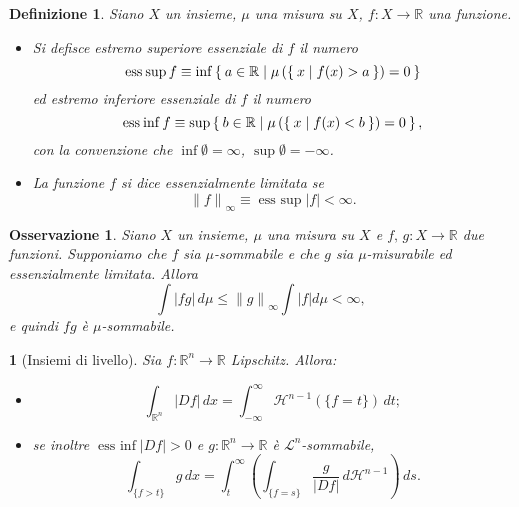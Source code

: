 \documentclass[a4paper,10pt,openright,oneside]{book}
\theoremstyle{theoremstyle}
\theoremstyle{theoremstylewoheader}
\newtheorem{teorema2}[teorema]{}
\theoremstyle{theoremstyle}
\newtheorem{definizione}[teorema]{Definizione}
\newtheorem{osservazione}[teorema]{Osservazione}
\theoremstyle{proofsecstyle}
\theoremstyle{nonumberplain}
\newcommand{\RR}{\ensuremath{\mathbb{R}}}
\newcommand{\Leb}{\ensuremath{\mathcal{L}}}
\newcommand{\Haus}{\ensuremath{\mathcal{H}}}
\newcommand{\abs}[1]{\ensuremath{\lvert #1 \rvert}}
\newcommand{\norm}[1]{\ensuremath{\| #1 \|}}
\DeclareMathOperator{\esssup}{ess\:sup}
\DeclareMathOperator{\essinf}{ess\:inf}
\begin{document}
\begin{definizione}
Siano $X$ un insieme, $\mu$ una misura su $X$, $f : X \rightarrow \RR$ una funzione.
\begin{itemize}
\item[(i)] Si defisce \emph{estremo superiore essenziale} di $f$ il numero
\[
\esssup f \equiv \inf\Set{ a \in \RR | \mu\left(\Set{ x | f(x) > a }\right) = 0 }
\] 
ed \emph{estremo inferiore essenziale} di $f$ il numero
\[
\essinf f \equiv \sup\Set{ b \in \RR | \mu\left(\Set{ x | f(x) < b }\right) = 0 },
\] 
con la convenzione che $\inf\emptyset = \infty$, $\sup\emptyset = -\infty$.
\item[(ii)] La funzione $f$ si dice \emph{essenzialmente limitata} se
\[
\norm{f}_\infty \equiv \esssup\abs{f} < \infty.
\]
\end{itemize}
\end{definizione}

\begin{osservazione}
\label{oss:funzioni_essenzialmente_limitate}
Siano $X$ un insieme, $\mu$ una misura su $X$ e $f,\, g : X \rightarrow \RR$ due funzioni. Supponiamo che $f$ sia $\mu$-sommabile e che $g$ sia $\mu$-misurabile ed essenzialmente limitata. Allora
\[
\int \abs{fg}\, d\mu \le \norm{g}_\infty \int \abs{f} d\mu < \infty,
\]
e quindi $fg$ è $\mu$-sommabile. 
\end{osservazione}

\begin{teorema2}[Insiemi di livello]
\label{thm:insiemi_di_livello}
Sia $f : \RR^n \rightarrow \RR$ Lipschitz. Allora:
\begin{itemize}
\item[(i)]
\[
\int_{\RR^n} \abs{Df}\, dx = \int_{-\infty}^\infty \Haus^{n-1}(\{f = t\})\, dt;
\]
\item[(ii)] se inoltre $\essinf \abs{Df} > 0$ e $g : \RR^n \rightarrow \RR$ è $\Leb^n$-sommabile,
\[
\int_{\{f > t\}} g\, dx = \int_t^\infty \left(\int_{\{f = s\}} \frac{g}{\abs{Df}}\, d\Haus^{n-1}\right)\, ds.
\]
\end{itemize}
\end{teorema2}
\end{document}
